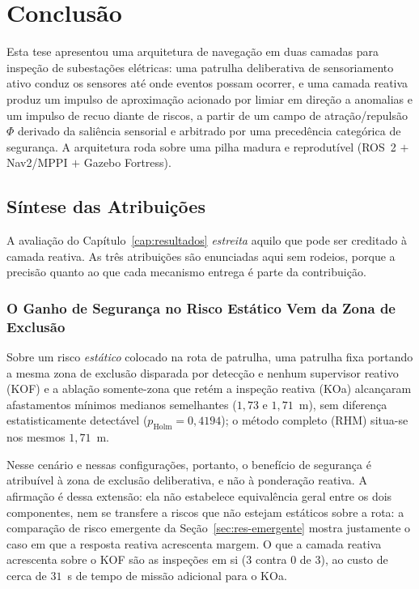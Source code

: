 \chapter{Conclusão}
\label{cap:conclusao}

Esta tese apresentou uma arquitetura de navegação em duas camadas para inspeção de
subestações elétricas: uma patrulha deliberativa de sensoriamento ativo conduz os
sensores até onde eventos possam ocorrer, e uma camada reativa produz um impulso de
aproximação acionado por limiar em direção a anomalias e um impulso de recuo diante
de riscos, a partir de um campo de atração/repulsão $\Phi$ derivado da saliência
sensorial e arbitrado por uma precedência categórica de segurança. A arquitetura
roda sobre uma pilha madura e reprodutível (ROS~2 $+$ Nav2/MPPI $+$ Gazebo Fortress).

\section{Síntese das Atribuições}
\label{sec:conc-atribuicoes}

A avaliação do Capítulo~\ref{cap:resultados} \emph{estreita} aquilo que pode ser
creditado à camada reativa. As três atribuições são enunciadas aqui sem rodeios,
porque a precisão quanto ao que cada mecanismo entrega é parte da contribuição.

\subsection{O Ganho de Segurança no Risco Estático Vem da Zona de Exclusão}

Sobre um risco \emph{estático} colocado na rota de patrulha, uma patrulha fixa
portando a mesma zona de exclusão disparada por detecção e nenhum supervisor reativo
(KOF) e a ablação somente-zona que retém a inspeção reativa (KOa) alcançaram
afastamentos mínimos medianos semelhantes ($1{,}73$ e $1{,}71$~m), sem diferença
estatisticamente detectável ($p_{\mathrm{Holm}}=0{,}4194$); o método completo (RHM)
situa-se nos mesmos $1{,}71$~m.

Nesse cenário e nessas configurações, portanto, o benefício de segurança é atribuível
à zona de exclusão deliberativa, e não à ponderação reativa. A afirmação é dessa
extensão: ela não estabelece equivalência geral entre os dois componentes, nem se
transfere a riscos que não estejam estáticos sobre a rota: a comparação de risco
emergente da Seção~\ref{sec:res-emergente} mostra justamente o caso em que a resposta
reativa acrescenta margem. O que a camada reativa acrescenta sobre o KOF são as
inspeções em si ($3$ contra $0$ de $3$), ao custo de cerca de $31$~s de tempo de
missão adicional para o KOa.

